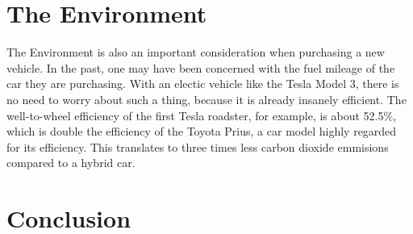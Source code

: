 \documentclass{article}
\begin{document}
  \section{The Environment}
  The Environment is also an important consideration when purchasing a new vehicle.
  In the past, one may have been concerned with the fuel mileage of the car they are purchasing.
  With an electic vehicle like the Tesla Model 3, there is no need to worry about such a thing,
  because it is already insanely efficient. The well-to-wheel efficiency of the first Tesla roadster,
  for example, is about 52.5\%, which is double the efficiency of the Toyota Prius\cite{eberhard200621},
  a car model highly regarded for its efficiency. This translates to three times less carbon dioxide
  emmisions compared to a hybrid car.\cite{eberhard200621}

  \section{Conclusion}
  \blindtext{}\blindtext{}


\end{document}
